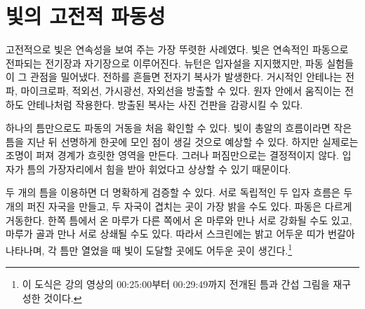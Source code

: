 \section{빛의 고전적 파동성}

고전적으로 빛은 연속성을 보여 주는 가장 뚜렷한 사례였다. 빛은 연속적인 파동으로 전파되는 전기장과 자기장으로 이루어진다. 뉴턴은 입자설을 지지했지만, 파동 실험들이 그 관점을 밀어냈다. 전하를 흔들면 전자기 복사가 발생한다. 거시적인 안테나는 전파, 마이크로파, 적외선, 가시광선, 자외선을 방출할 수 있다. 원자 안에서 움직이는 전하도 안테나처럼 작용한다. 방출된 복사는 사진 건판을 감광시킬 수 있다.

하나의 틈만으로도 파동의 거동을 처음 확인할 수 있다. 빛이 총알의 흐름이라면 작은 틈을 지난 뒤 선명하게 한곳에 모인 점이 생길 것으로 예상할 수 있다. 하지만 실제로는 조명이 퍼져 경계가 흐릿한 영역을 만든다. 그러나 퍼짐만으로는 결정적이지 않다. 입자가 틈의 가장자리에서 힘을 받아 휘었다고 상상할 수 있기 때문이다.

두 개의 틈을 이용하면 더 명확하게 검증할 수 있다. 서로 독립적인 두 입자 흐름은 두 개의 퍼진 자국을 만들고, 두 자국이 겹치는 곳이 가장 밝을 수도 있다. 파동은 다르게 거동한다. 한쪽 틈에서 온 마루가 다른 쪽에서 온 마루와 만나 서로 강화될 수도 있고, 마루가 골과 만나 서로 상쇄될 수도 있다. 따라서 스크린에는 밝고 어두운 띠가 번갈아 나타나며, 각 틈만 열었을 때 빛이 도달할 곳에도 어두운 곳이 생긴다.\footnote{이 도식은 강의 영상의 00:25:00부터 00:29:49까지 전개된 틈과 간섭 그림을 재구성한 것이다.}

